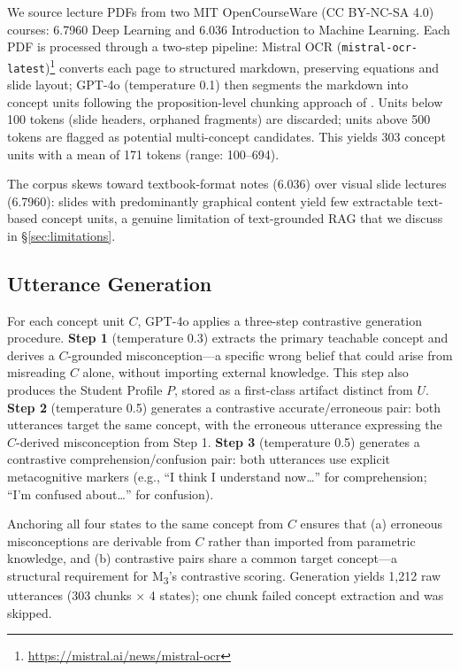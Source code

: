 \documentclass[11pt]{article}
\newcommand{\mthree}{M\textsubscript{3}\xspace}
\begin{document}
We source lecture PDFs from two MIT OpenCourseWare (CC BY-NC-SA 4.0)
courses: 6.7960 Deep Learning and 6.036 Introduction to Machine Learning.
Each PDF is processed through a two-step pipeline: Mistral OCR
(\texttt{mistral-ocr-latest})\footnote{\url{https://mistral.ai/news/mistral-ocr}} converts each page to structured markdown,
preserving equations and slide layout; GPT-4o (temperature 0.1) then
segments the markdown into concept units following the proposition-level
chunking approach of \citet{chen2024dense}.
Units below 100 tokens (slide headers, orphaned fragments) are discarded;
units above 500 tokens are flagged as potential multi-concept candidates.
This yields 303 concept units with a mean of 171 tokens (range: 100--694).

The corpus skews toward textbook-format notes (6.036) over visual slide
lectures (6.7960): slides with predominantly graphical content yield few
extractable text-based concept units, a genuine limitation of text-grounded
RAG that we discuss in \S\ref{sec:limitations}.

\subsection{Utterance Generation}

For each concept unit $C$, GPT-4o applies a three-step contrastive
generation procedure.
\textbf{Step 1} (temperature 0.3) extracts the primary teachable concept
and derives a $C$-grounded misconception---a specific wrong belief that could
arise from misreading $C$ alone, without importing external knowledge.
This step also produces the Student Profile $P$, stored as a first-class
artifact distinct from $U$.
\textbf{Step 2} (temperature 0.5) generates a contrastive
accurate/erroneous pair: both utterances target the same concept, with the
erroneous utterance expressing the $C$-derived misconception from Step 1.
\textbf{Step 3} (temperature 0.5) generates a contrastive
comprehension/confusion pair: both utterances use explicit metacognitive
markers (e.g., ``I think I understand now\ldots'' for comprehension;
``I'm confused about\ldots'' for confusion).

Anchoring all four states to the same concept from $C$ ensures that (a)
erroneous misconceptions are derivable from $C$ rather than imported from
parametric knowledge, and (b) contrastive pairs share a common target
concept---a structural requirement for \mthree's contrastive scoring.
Generation yields 1{,}212 raw utterances (303 chunks $\times$ 4 states);
one chunk failed concept extraction and was skipped.
\end{document}
